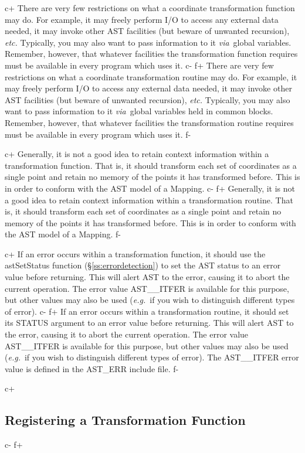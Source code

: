 \documentclass[twoside,11pt]{starlink}
\providecommand{\secref}[1]{\S\ref{#1}}
\begin{document}
c+
There are very few restrictions on what a coordinate transformation
function may do. For example, it may freely perform I/O to access any
external data needed, it may invoke other AST facilities (but beware
of unwanted recursion), \emph{etc.} Typically, you may also want to
pass information to it \emph{via}\ global variables. Remember,
however, that whatever facilities the transformation function requires
must be available in every program which uses it.
c-
f+
There are very few restrictions on what a coordinate transformation
routine may do. For example, it may freely perform I/O to access any
external data needed, it may invoke other AST facilities (but beware
of unwanted recursion), \emph{etc.} Typically, you may also want to
pass information to it \emph{via}\ global variables held in common
blocks.  Remember, however, that whatever facilities the
transformation routine requires must be available in every program
which uses it.
f-

c+
Generally, it is not a good idea to retain context information within
a transformation function. That is, it should transform each set of
coordinates as a single point and retain no memory of the points it
has transformed before. This is in order to conform with the AST model
of a Mapping.
c-
f+
Generally, it is not a good idea to retain context information within
a transformation routine. That is, it should transform each set of
coordinates as a single point and retain no memory of the points it
has transformed before. This is in order to conform with the AST model
of a Mapping.
f-

c+
If an error occurs within a transformation function, it should use the
astSetStatus function (\secref{ss:errordetection}) to set the AST
status to an error value before returning. This will alert AST to the
error, causing it to abort the current operation. The error value
AST\_\_ITFER is available for this purpose, but other values may also
be used (\emph{e.g.}\ if you wish to distinguish different types of
error).
c-
f+
If an error occurs within a transformation routine, it should set its
STATUS argument to an error value before returning. This will alert
AST to the error, causing it to abort the current operation. The error
value AST\_\_ITFER is available for this purpose, but other values may
also be used (\emph{e.g.}\ if you wish to distinguish different types
of error). The AST\_\_ITFER error value is defined in the AST\_ERR
include file.
f-

c+
\subsection{\label{ss:registeringintramaps}Registering a Transformation Function}
c-
f+
\end{document}
